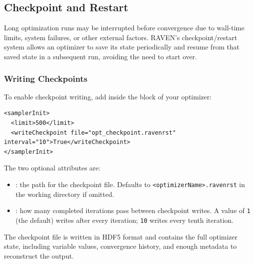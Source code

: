 
\subsection{Checkpoint and Restart} \label{subsec:opt checkpoint restart}
Long optimization runs may be interrupted before convergence due to wall-time limits, system
failures, or other external factors.  RAVEN's checkpoint/restart system allows an optimizer to
save its state periodically and resume from that saved state in a subsequent run, avoiding the
need to start over.

\subsubsection{Writing Checkpoints}
To enable checkpoint writing, add  inside the 
block of your optimizer:
\begin{lstlisting}[style=XML]
<samplerInit>
  <limit>500</limit>
  <writeCheckpoint file="opt_checkpoint.ravenrst" interval="10">True</writeCheckpoint>
</samplerInit>
\end{lstlisting}
The two optional attributes are:
\begin{itemize}
  \item {}: the path for the checkpoint file.  Defaults to
    \texttt{<optimizerName>.ravenrst} in the working directory if omitted.
  \item {}: how many completed iterations pass between checkpoint writes.
    A value of \texttt{1} (the default) writes after every iteration; \texttt{10} writes every
    tenth iteration.
\end{itemize}
The checkpoint file is written in HDF5 format and contains the full optimizer state, including
variable values, convergence history, and enough metadata to reconstruct the
 output.

